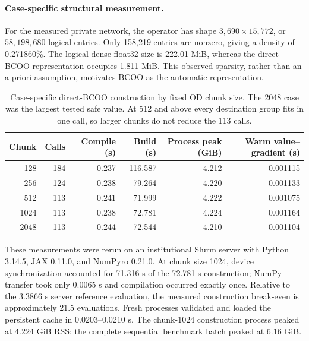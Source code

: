 \paragraph{Case-specific structural measurement.}
For the measured private network, the operator has shape $3{,}690\times15{,}772$, or
$58{,}198{,}680$ logical entries. Only 158,219 entries are nonzero, giving a
density of 0.271860\%. The logical dense float32 size is 222.01 MiB, whereas
the direct BCOO representation occupies 1.811 MiB. This observed sparsity,
rather than an a-priori assumption, motivates BCOO as the automatic
representation.

\begin{table}[htbp]
\centering
\begin{tabular}{rrrrrr}
\hline
Chunk & Calls & Compile (s) & Build (s) & Process peak (GiB) & Warm value--gradient (s) \\
\hline
128  & 184 & 0.237 & 116.587 & 4.212 & 0.001115 \\
256  & 124 & 0.238 & 79.264  & 4.220 & 0.001133 \\
512  & 113 & 0.241 & 71.999  & 4.222 & 0.001075 \\
1024 & 113 & 0.238 & 72.781  & 4.224 & 0.001164 \\
2048 & 113 & 0.244 & 72.544  & 4.210 & 0.001104 \\
\hline
\end{tabular}
\caption{Case-specific direct-BCOO construction by fixed OD chunk size. The 2048 case
was the largest tested safe value. At 512 and above every destination group
fits in one call, so larger chunks do not reduce the 113 calls.}
\label{tab:case-specific-operator-construction}
\end{table}

These measurements were rerun on an institutional Slurm server with Python 3.14.5,
JAX 0.11.0, and NumPyro 0.21.0. At chunk size 1024, device synchronization
accounted for 71.316 s of the 72.781 s construction; NumPy transfer took only
0.0065 s and compilation occurred exactly once. Relative to the 3.3866 s server
reference evaluation, the measured construction break-even is approximately
21.5 evaluations. Fresh processes validated and loaded the persistent cache in
0.0203--0.0210 s. The chunk-1024 construction process peaked at 4.224 GiB RSS;
the complete sequential benchmark batch peaked at 6.16 GiB.

